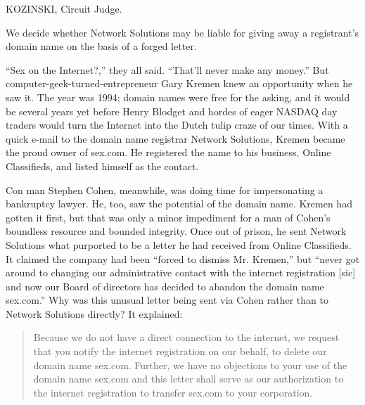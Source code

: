 
KOZINSKI, Circuit Judge.

We decide whether Network Solutions may be liable for giving away a registrant's
domain name on the basis of a forged letter.


``Sex on the Internet?,'' they all said. ``That'll never make any money.'' But
computer-geek-turned-entrepreneur Gary Kremen knew an opportunity when he saw
it. The year was 1994; domain names were free for the asking, and it would be
several years yet before Henry Blodget and hordes of eager NASDAQ day traders
would turn the Internet into the Dutch tulip craze of our times. With a quick
e-mail to the domain name registrar Network Solutions, Kremen became the proud
owner of sex.com. He registered the name to his business, Online Classifieds,
and listed himself as the contact.

Con man Stephen Cohen, meanwhile, was doing time for impersonating a bankruptcy
lawyer. He, too, saw the potential of the domain name. Kremen had gotten it
first, but that was only a minor impediment for a man of Cohen's boundless
resource and bounded integrity. Once out of prison, he sent Network Solutions
what purported to be a letter he had received from Online Classifieds. It
claimed the company had been ``forced to dismiss Mr. Kremen,'' but ``never got
around to changing our administrative contact with the internet registration
[sic] and now our Board of directors has decided to abandon the domain name
sex.com.'' Why was this unusual letter being sent via Cohen rather than to
Network Solutions directly? It explained:
\begin{quote}
Because we do not have a direct connection to the internet, we request that you
notify the internet registration on our behalf, to delete our domain name
sex.com. Further, we have no objections to your use of the domain name sex.com
and this letter shall serve as our authorization to the internet registration
to transfer sex.com to your
corporation.
\end{quote}

